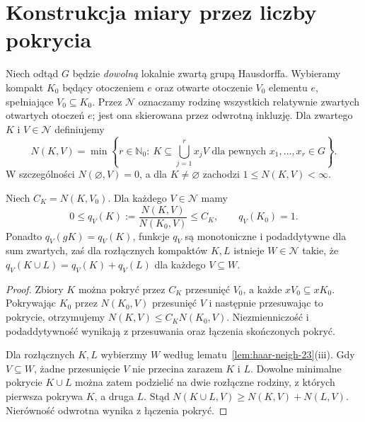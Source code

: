 \section{Konstrukcja miary przez liczby pokrycia}
Niech odtąd $G$ będzie \emph{dowolną} lokalnie zwartą
grupą Hausdorffa. Wybieramy kompakt $K_0$ będący otoczeniem $e$
oraz otwarte otoczenie $V_0$ elementu $e$,
spełniające $V_0\subseteq K_0$. Przez $\mathcal N$
oznaczamy rodzinę wszystkich relatywnie zwartych otwartych
otoczeń $e$; jest ona skierowana przez odwrotną inkluzję.
Dla zwartego $K$ i $V\in\mathcal N$ definiujemy
\begin{equation}\label{eq:haar-cover-number-23}
 N(K,V)=\min\left\{r\in\mathbb N_0:\
 K\subseteq\bigcup_{j=1}^{r}x_jV
 \text{ dla pewnych }x_1,\dots,x_r\in G\right\}.
\end{equation}
W szczególności $N(\varnothing,V)=0$, a dla
$K\ne\varnothing$ zachodzi $1\le N(K,V)<\infty$.

\begin{lemat}
\label{lem:haar-ratio-23}
Niech $C_K=N(K,V_0)$. Dla każdego $V\in\mathcal N$ mamy
\[
 0\le q_V(K):=\frac{N(K,V)}{N(K_0,V)}\le C_K,
 \qquad q_V(K_0)=1.
\]
Ponadto $q_V(gK)=q_V(K)$, funkcje $q_V$ są monotoniczne
i podaddytywne dla sum zwartych, zaś dla rozłącznych
kompaktów $K,L$ istnieje $W\in\mathcal N$ takie, że
$q_V(K\cup L)=q_V(K)+q_V(L)$ dla każdego $V\subseteq W$.
\end{lemat}
\begin{proof}
Zbiory $K$ można pokryć przez $C_K$ przesunięć $V_0$,
a każde $xV_0\subseteq xK_0$. Pokrywając $K_0$
przez $N(K_0,V)$ przesunięć $V$ i następnie przesuwając
to pokrycie, otrzymujemy $N(K,V)\le C_KN(K_0,V)$.
Niezmienniczość i podaddytywność wynikają z przesuwania
oraz łączenia skończonych pokryć.

Dla rozłącznych $K,L$ wybierzmy $W$ według
lematu~\ref{lem:haar-neigh-23}(iii). Gdy $V\subseteq W$,
żadne przesunięcie $V$ nie przecina zarazem $K$ i $L$.
Dowolne minimalne pokrycie $K\cup L$ można zatem
podzielić na dwie rozłączne rodziny, z których pierwsza
pokrywa $K$, a druga $L$. Stąd
$N(K\cup L,V)\ge N(K,V)+N(L,V)$.
Nierówność odwrotna wynika z łączenia pokryć.
\end{proof}

